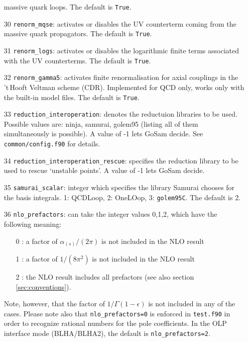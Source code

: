 \documentclass[11pt,a4paper]{refrep}
\newcommand{\gosam}{{\sc GoSam}\xspace}
\newcommand{\golemVC}{{\tt golem95C}\xspace}
\newcommand{\samurai}{{\sc Samurai}\xspace}
\newcommand{\tHV}{{'t\,Hooft Veltman}}
\begin{document}
\begin{enumerate}
massive quark loops. The default is  {\tt True}.
\item[30] \texttt{renorm\_mqse}:  activates or disables the UV counterterm coming from the 
massive quark propagators. The default is  {\tt True}.
\item[31] \texttt{renorm\_logs}: activates or disables the logarithmic finite terms  
associated with the UV counterterms.   The default is  {\tt True}.
\item[32] \texttt{renorm\_gamma5}: activates finite renormalisation for axial couplings in the 
 \tHV{} scheme (CDR).                      
Implemented for QCD only, works only with the built-in model files.    The default is  {\tt True}.
\item[33] \texttt{reduction\_interoperation}: denotes the reductuion libraries to be used. 
  Possible values are: ninja, samurai, golem95 (listing all of them simultaneously is possible). 
  A value of -1 lets \gosam{} decide.
  See {\tt common/config.f90} for details.                              
\item[34] \texttt{reduction\_interoperation\_rescue}: specifies the reduction library to be used to rescue `unstable points'. A value of -1 lets \gosam{} decide.
\item[35] \texttt{samurai\_scalar}: integer which specifies the library \samurai{} 
chooses for the basis integrals. 1: {\sc QCDLoop}, 2: {\sc OneLOop}, 3: \golemVC. The default is 2. 
\item[36] \texttt{nlo\_prefactors}:  can take the integer values 0,1,2, which have the        
    following meaning:    
    \begin{enumerate}                                          
    \item[0]: a factor of $\alpha_{(s)}/(2\pi)$ is not included in the NLO result
    \item[1]: a factor of $1/(8\pi^2)$ is not included in the NLO result       
    \item[2]: the NLO result includes all prefactors   (see also section \ref{sec:conventions}).
    \end{enumerate}                           
    Note, however, that the factor of $1/\Gamma(1-\epsilon)$ is not         
    included in any of the cases.                                   
    Please note also that {\tt nlo\_prefactors=0} is enforced in {\tt test.f90}
    in order to recognize rational numbers for the 
    pole coefficients. In the OLP interface mode (BLHA/BLHA2), the default is
    {\tt nlo\_prefactors=2}.                                 

\end{enumerate}
\end{document}
